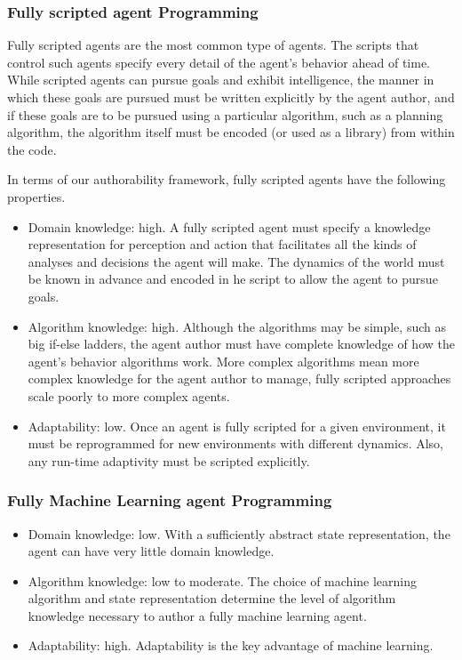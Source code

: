 \subsubsection{Fully scripted agent Programming}

Fully scripted agents are the most common type of agents.  The scripts that control such agents specify every detail of the agent's behavior ahead of time.  While scripted agents can pursue goals and exhibit intelligence, the manner in which these goals are pursued must be written explicitly by the agent author, and if these goals are to be pursued using a particular algorithm, such as a planning algorithm, the algorithm itself must be encoded (or used as a library) from within the code.

In terms of our authorability framework, fully scripted agents have the
following properties.
\begin{itemize}
\item Domain knowledge: high. A fully scripted agent must specify a knowledge representation for perception and action that facilitates all the kinds of analyses and decisions the agent will make.  The dynamics of the world must be known in advance and encoded in he script to allow the agent to pursue goals.
\item Algorithm knowledge: high.  Although the algorithms may be simple, such as big if-else ladders, the agent author must have complete knowledge of how the agent's behavior algorithms work.  More complex algorithms mean more complex knowledge for the agent author to manage, fully scripted approaches scale poorly to more complex agents.
\item Adaptability: low.  Once an agent is fully scripted for a given environment, it must be reprogrammed for new environments with different dynamics.  Also, any run-time adaptivity must be scripted explicitly.
\end{itemize}

\subsubsection{Fully Machine Learning agent Programming}

\begin{itemize}
\item Domain knowledge: low. With a sufficiently abstract state
  representation, the agent can have very little domain knowledge.
\item Algorithm knowledge: low to moderate.  The choice of machine
  learning algorithm and state representation determine the level of
  algorithm knowledge necessary to author a fully machine learning
  agent.
\item Adaptability: high.  Adaptability is the key advantage of
  machine learning.
\end{itemize}

